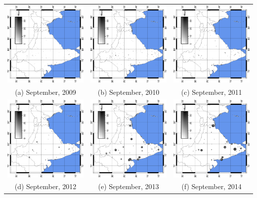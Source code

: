 \documentclass{standalone}
\begin{document}
{\small
\begin{tabular}{ *3{c} }
  \includegraphics[width=.3\linewidth, angle=270]{2009_09} & 
  \includegraphics[width=.3\linewidth, angle=270]{2010_09} & 
  \includegraphics[width=.3\linewidth, angle=270]{2011_09} \\
  (a) September, 2009 & (b) September, 2010 & (c) September, 2011\\
  \includegraphics[width=.3\linewidth, angle=270]{2012_09} & 
  \includegraphics[width=.3\linewidth, angle=270]{2013_09} & 
  \includegraphics[width=.3\linewidth, angle=270]{2014_09} \\
  (d) September, 2012 & (e) September, 2013 & (f) September, 2014\\
\end{tabular}

}
\end{document}
